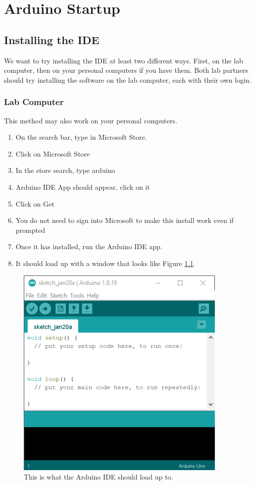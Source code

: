 \chapter{Arduino Startup}

\section{Installing the IDE}
We want to try installing the IDE at least two different ways. First, on the lab computer, then on your personal
computers if you have them. Both lab partners should try installing the software on the lab computer, each with 
their own login.

\subsection{Lab Computer}
This method may also work on your personal computers.
\begin{enumerate}
    \item On the search bar, type in Microsoft Store.
    \item Click on Microsoft Store
    \item In the store search, type arduino
    \item Arduino IDE App should appear, click on it
    \item Click on Get
    \item You do not need to sign into Microsoft to make this install work even if prompted
    \item Once it has installed, run the Arduino IDE app. 
	\item It should load up with a window that looks like Figure \ref{fig:emptysketch}.
\end{enumerate}

\begin{figure}[!htb]
	\centering
	\includegraphics[scale=1.0]{arduinoStart/emptysketch.PNG}
	\caption{This is what the Arduino IDE should load up to.}
	\label{fig:emptysketch}
\end{figure} 

